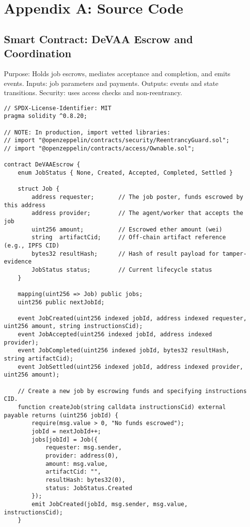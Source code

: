 ﻿\chapter{Appendix A: Source Code}
\label{appendix:sourcecode}

\section{Smart Contract: DeVAA Escrow and Coordination}
\noindent Purpose: Holds job escrows, mediates acceptance and completion, and emits events. Inputs: job parameters and payments. Outputs: events and state transitions. Security: uses access checks and non-reentrancy.

\lstset{style=code}
\begin{lstlisting}[language=Solidity,caption={DeVAAEscrow.sol}]
// SPDX-License-Identifier: MIT
pragma solidity ^0.8.20;

// NOTE: In production, import vetted libraries:
// import "@openzeppelin/contracts/security/ReentrancyGuard.sol";
// import "@openzeppelin/contracts/access/Ownable.sol";

contract DeVAAEscrow {
    enum JobStatus { None, Created, Accepted, Completed, Settled }

    struct Job {
        address requester;       // The job poster, funds escrowed by this address
        address provider;        // The agent/worker that accepts the job
        uint256 amount;          // Escrowed ether amount (wei)
        string  artifactCid;     // Off-chain artifact reference (e.g., IPFS CID)
        bytes32 resultHash;      // Hash of result payload for tamper-evidence
        JobStatus status;        // Current lifecycle status
    }

    mapping(uint256 => Job) public jobs;
    uint256 public nextJobId;

    event JobCreated(uint256 indexed jobId, address indexed requester, uint256 amount, string instructionsCid);
    event JobAccepted(uint256 indexed jobId, address indexed provider);
    event JobCompleted(uint256 indexed jobId, bytes32 resultHash, string artifactCid);
    event JobSettled(uint256 indexed jobId, address indexed provider, uint256 amount);

    // Create a new job by escrowing funds and specifying instructions CID.
    function createJob(string calldata instructionsCid) external payable returns (uint256 jobId) {
        require(msg.value > 0, "No funds escrowed");
        jobId = nextJobId++;
        jobs[jobId] = Job({
            requester: msg.sender,
            provider: address(0),
            amount: msg.value,
            artifactCid: "",
            resultHash: bytes32(0),
            status: JobStatus.Created
        });
        emit JobCreated(jobId, msg.sender, msg.value, instructionsCid);
    }


\end{lstlisting}
